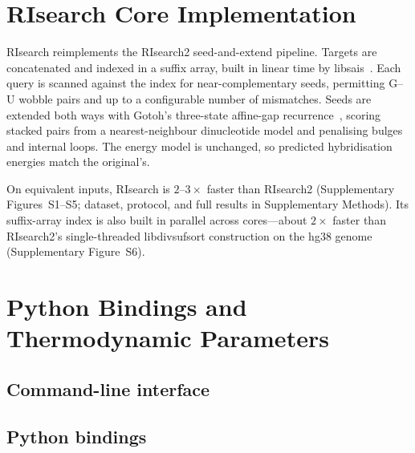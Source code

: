 \section{RIsearch Core Implementation}\label{sec:core}

RIsearch reimplements the RIsearch2 seed-and-extend pipeline. Targets are
concatenated and indexed in a suffix array, built in linear time by
libsais~\citep{libsais}. Each query is scanned against the index for
near-complementary seeds, permitting G--U wobble pairs and up to a configurable
number of mismatches. Seeds are extended both ways with Gotoh's three-state
affine-gap recurrence~\citep{gotoh1982improved}, scoring stacked pairs from a
nearest-neighbour dinucleotide model and penalising bulges and internal loops.
The energy model is unchanged, so predicted hybridisation energies match the
original's.

On equivalent inputs, RIsearch is $2$--$3\times$ faster than RIsearch2
(Supplementary Figures~S1--S5; dataset, protocol, and full results in
Supplementary Methods). Its
suffix-array index is also built in parallel across cores---about $2\times$
faster than RIsearch2's single-threaded libdivsufsort construction on the hg38
genome (Supplementary Figure~S6).

\section{Python Bindings and Thermodynamic Parameters}\label{sec:bindings}

\subsection{Command-line interface}\label{subsec:cli}


\subsection{Python bindings}\label{subsec:pybindings}

